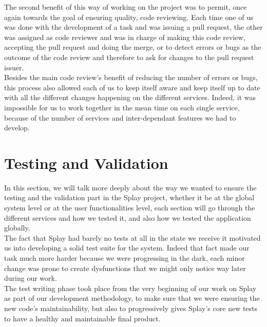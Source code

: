 \documentclass{eplmastersthesis}
\begin{document}
          The second benefit of this way of working on the project was to
          permit, once again towards the goal of ensuring quality, code
          reviewing. Each time one of us was done with the development of a
          task and was issuing a pull request, the other was assigned as code
          reviewer and was in charge of making this code review, accepting the
          pull request and doing the merge, or to detect errors or bugs as the
          outcome of the code review and therefore to ask for changes to the
          pull request issuer.\\
          Besides the main code review's benefit of reducing the number of
          errors or bugs, this process also allowed each of us to keep itself
          aware and keep itself up to date with all the different changes
          happening on the different services. Indeed, it was impossible for
          us to work together in the mean time on each single service, because
          of the number of services and inter-dependant features we had to
          develop.

    \section{Testing and Validation}

      In this section, we will talk more deeply about the way we wanted to ensure
      the testing and the validation part in the Splay project, whether it be
      at the global system level or at the user functionalities level, each
      section will go through the different services and how we tested it, and
      also how we tested the application globally.\\

      The fact that Splay had barely no tests at all in the state we receive it
      motivated us into developing a solid test suite for the system.
      Indeed that fact made our task much more harder because we were progressing
      in the dark, each minor change was prone to create dysfunctions that we
      might only notice way later during our work.\\

      The test writing phase took place from the very beginning of our work on
      Splay as part of our development methodology,
      to make sure that we were ensuring the new code's maintainability, but
      also to progressively gives Splay's core new tests to have a healthy
      and maintainable final product.
\end{document}
